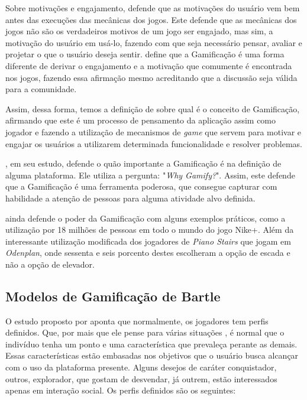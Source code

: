 Sobre motivações e engajamento, \cite{chou2015actionable}  defende que as motivações
do usuário vem bem antes das execuções das mecânicas dos jogos. Este defende
que as mecânicas dos jogos não são os verdadeiros motivos de um jogo ser
engajado, mas sim, a motivação do usuário em usá-lo, fazendo com que seja
necessário pensar, avaliar e projetar o que o usuário deseja sentir. \cite{chou2015actionable} define que a Gamificação é uma forma diferente de derivar o engajamento
e a motivação  que comumente é encontrada nos jogos, fazendo essa afirmação
mesmo acreditando que a discussão seja válida para a comunidade.

Assim, dessa forma, temos a definição de \cite{zichermann2011gamification} sobre qual é o conceito de
Gamificação, afirmando que este é um processo de pensamento da aplicação assim
como jogador e fazendo a utilização
de mecanismos de \textit{game} que servem para motivar e engajar os usuários a utilizarem
determinada funcionalidade e resolver problemas.

\cite{zichermann2011gamification}, em seu estudo, defende o quão importante a Gamificação é na definição
de alguma plataforma. Ele utiliza a pergunta: "\textit{Why Gamify?}". Assim, este defende
que a Gamificação é uma ferramenta poderosa, que consegue capturar com habilidade
a atenção de pessoas para alguma atividade alvo definida.

\cite{zichermann2011gamification} ainda defende  o poder da Gamificação com alguns exemplos práticos,
como a utilização por 18 milhões de pessoas em todo o mundo do jogo Nike+.
Além da interessante utilização modificada dos jogadores de
\textit{Piano Stairs} que jogam em \textit{Odenplan}, onde sessenta e seis porcento destes
escolheram a opção de escada e não a opção de elevador.

\subsection{Modelos de Gamificação de Bartle}
\label{sub:modeloBartle}
O estudo proposto por \cite{bartle1996hearts} aponta que normalmente, os jogadores
tem perfis definidos. Que, por mais que ele pense para várias situações
, é normal que o indivíduo tenha um ponto e uma característica que prevaleça
perante as demais. Essas características estão embasadas nos objetivos
que o usuário  busca alcançar com o uso da plataforma presente.
Alguns desejos de caráter conquistador, outros, explorador, que gostam
de desvendar, já outrem, estão interessados apenas em interação
social. Os perfis definidos são os seguintes:


